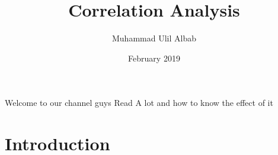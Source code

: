 \documentclass{article}
\title{Correlation Analysis}
\author{Muhammad Ulil Albab }
\date{February 2019}
\begin{document}
Welcome to our channel guys
Read A lot and how to know the effect of it
\maketitle

\section{Introduction}
\end{document}
